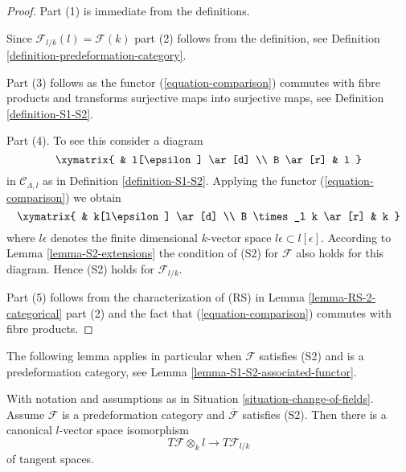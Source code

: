 \begin{proof}
Part (1) is immediate from the definitions.

\medskip\noindent
Since $\mathcal{F}_{l/k}(l) = \mathcal{F}(k)$ part (2) follows from the
definition, see Definition \ref{definition-predeformation-category}.

\medskip\noindent
Part (3) follows as the functor (\ref{equation-comparison}) commutes with
fibre products and transforms surjective maps into surjective maps, see
Definition \ref{definition-S1-S2}.

\medskip\noindent
Part (4). To see this consider a diagram
$$
\xymatrix{
          & l[\epsilon] \ar[d] \\
B  \ar[r] & l
}
$$
in $\mathcal{C}_{\Lambda, l}$ as in Definition \ref{definition-S1-S2}.
Applying the functor (\ref{equation-comparison}) we obtain
$$
\xymatrix{
          & k[l\epsilon] \ar[d] \\
B \times_l k  \ar[r] & k
}
$$
where $l\epsilon$ denotes the finite dimensional $k$-vector space
$l\epsilon \subset l[\epsilon]$. According to Lemma \ref{lemma-S2-extensions}
the condition of (S2) for $\mathcal{F}$ also holds for this diagram.
Hence (S2) holds for $\mathcal{F}_{l/k}$.

\medskip\noindent
Part (5) follows from the characterization of (RS) in
Lemma \ref{lemma-RS-2-categorical} part (2) and the fact that
(\ref{equation-comparison}) commutes with fibre products.
\end{proof}

\noindent
The following lemma applies in particular when $\mathcal{F}$
satisfies (S2) and is a predeformation category, see
Lemma \ref{lemma-S1-S2-associated-functor}.

\begin{lemma}
\label{lemma-tangent-space-change-of-field}
With notation and assumptions as in Situation \ref{situation-change-of-fields}.
Assume $\mathcal{F}$ is a predeformation category and
$\overline{\mathcal{F}}$ satisfies (S2). Then there is a
canonical $l$-vector space isomorphism
$$
T\mathcal{F} \otimes_k l \longrightarrow T\mathcal{F}_{l/k}
$$
of tangent spaces.
\end{lemma}

